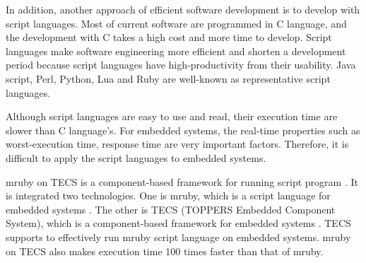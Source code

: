 \documentclass[conference,compsoc]{IEEEtran}
\begin{document}
In addition, another approach of efficient software development is to develop with script languages.
Most of current software are programmed in C language, and the development with C takes a high cost and more time to develop.
Script languages make software engineering more efficient and shorten a development period because script languages have high-productivity from their usability.
Java script, Perl, Python, Lua and Ruby are well-known as representative script languages.

Although script languages are easy to use and read, their execution time are slower than C language's.
For embedded systems, the real-time properties such as worst-execution time, response time are very important factors.
Therefore, it is difficult to apply the script languages to embedded systems.

mruby on TECS is a component-based framework for running script program \cite{7153813}.
It is integrated two technologies.
One is mruby, which is a script language for embedded systems \cite{5959588}.
The other is TECS (TOPPERS Embedded Component System), which is a component-based framework for embedded systems \cite{4208825}.
TECS supports to effectively run mruby script language on embedded systems.
mruby on TECS also makes execution time 100 times faster than that of mruby.
\end{document}
